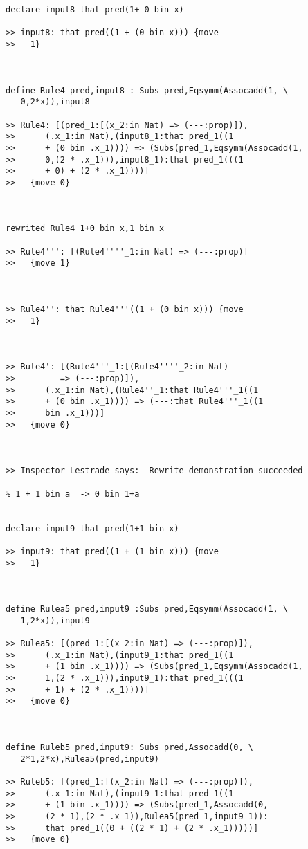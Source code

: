 \documentclass{article}
\begin{document}
\begin{verbatim}
declare input8 that pred(1+ 0 bin x)

>> input8: that pred((1 + (0 bin x))) {move
>>   1}



define Rule4 pred,input8 : Subs pred,Eqsymm(Assocadd(1, \
   0,2*x)),input8

>> Rule4: [(pred_1:[(x_2:in Nat) => (---:prop)]),
>>      (.x_1:in Nat),(input8_1:that pred_1((1
>>      + (0 bin .x_1)))) => (Subs(pred_1,Eqsymm(Assocadd(1,
>>      0,(2 * .x_1))),input8_1):that pred_1(((1
>>      + 0) + (2 * .x_1))))]
>>   {move 0}



rewrited Rule4 1+0 bin x,1 bin x

>> Rule4''': [(Rule4''''_1:in Nat) => (---:prop)]
>>   {move 1}



>> Rule4'': that Rule4'''((1 + (0 bin x))) {move
>>   1}



>> Rule4': [(Rule4'''_1:[(Rule4''''_2:in Nat)
>>         => (---:prop)]),
>>      (.x_1:in Nat),(Rule4''_1:that Rule4'''_1((1
>>      + (0 bin .x_1)))) => (---:that Rule4'''_1((1
>>      bin .x_1)))]
>>   {move 0}



>> Inspector Lestrade says:  Rewrite demonstration succeeded

% 1 + 1 bin a  -> 0 bin 1+a


declare input9 that pred(1+1 bin x)

>> input9: that pred((1 + (1 bin x))) {move
>>   1}



define Rulea5 pred,input9 :Subs pred,Eqsymm(Assocadd(1, \
   1,2*x)),input9

>> Rulea5: [(pred_1:[(x_2:in Nat) => (---:prop)]),
>>      (.x_1:in Nat),(input9_1:that pred_1((1
>>      + (1 bin .x_1)))) => (Subs(pred_1,Eqsymm(Assocadd(1,
>>      1,(2 * .x_1))),input9_1):that pred_1(((1
>>      + 1) + (2 * .x_1))))]
>>   {move 0}



define Ruleb5 pred,input9: Subs pred,Assocadd(0, \
   2*1,2*x),Rulea5(pred,input9)

>> Ruleb5: [(pred_1:[(x_2:in Nat) => (---:prop)]),
>>      (.x_1:in Nat),(input9_1:that pred_1((1
>>      + (1 bin .x_1)))) => (Subs(pred_1,Assocadd(0,
>>      (2 * 1),(2 * .x_1)),Rulea5(pred_1,input9_1)):
>>      that pred_1((0 + ((2 * 1) + (2 * .x_1)))))]
>>   {move 0}




\end{verbatim}
\end{document}
